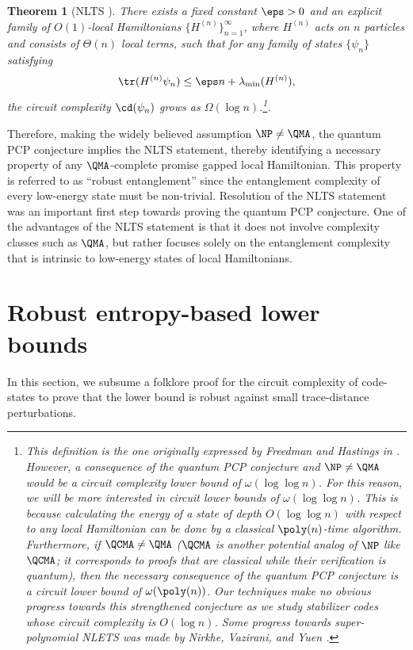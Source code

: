 \documentclass[11pt]{article}
\newtheorem{theorem}{Theorem}[section]
\begin{document}
\begin{theorem}[NLTS \cite{10.5555/2600498.2600507,nlts-proof}]
There exists a fixed constant $\eps > 0$ and an explicit family of $O(1)$-local Hamiltonians $\{H^{(n)}\}_{n=1}^\infty$, where $H^{(n)}$ acts on $n$ particles and consists of $\Theta(n)$ local terms, such that for any family of states $\{\psi_n\}$ satisfying %
\begin{align}\tr(H^{(n)} \psi_n) \leq \eps n + \lambda_{\min}(H^{(n)}),
\end{align}
the circuit complexity $\cd(\psi_n)$ grows as $\Omega(\log n)$.\footnote{This definition is the one originally expressed by Freedman and Hastings in \cite{10.5555/2600498.2600507}. However, a consequence of the quantum PCP conjecture and $\NP \neq \QMA$ would be a circuit complexity lower bound of $\omega(\log \log n)$. For this reason, we will be more interested in circuit lower bounds of $\omega(\log \log n)$. This is because calculating the energy of a state of depth $O(\log \log n)$ with respect to any local Hamiltonian can be done by a classical $\poly(n)$-time algorithm. Furthermore, if $\QCMA \neq \QMA$ ($\QCMA$ is another potential analog of $\NP$ like $\QCMA$; it corresponds to proofs that are classical while their verification is quantum), then the necessary consequence of the quantum PCP conjecture is a circuit lower bound of $\omega(\poly(n))$. Our techniques make no obvious progress towards this strengthened conjecture as we study stabilizer codes whose circuit complexity is $O(\log n)$. Some progress towards super-polynomial NLETS was made by Nirkhe, Vazirani, and Yuen \cite{nirkhe_et_al:LIPIcs:2018:9095}.}.
\end{theorem}

Therefore, making the widely believed assumption $\NP \neq \QMA$, the quantum PCP conjecture implies the NLTS statement, thereby identifying a necessary property of any $\QMA$-complete promise gapped local Hamiltonian. This property is referred to as ``robust entanglement'' since the entanglement complexity of every low-energy state must be non-trivial. Resolution of the NLTS statement was an important first step towards proving the quantum PCP conjecture. One of the advantages of the NLTS statement is that it does not involve complexity classes such as $\QMA$, but rather focuses solely on the entanglement complexity that is intrinsic to low-energy states of local Hamiltonians.



\section{Robust entropy-based lower bounds}
\label{sec:warmup-entropy}
In this section, we subsume a folklore proof for the circuit complexity of code-states to prove that the lower bound is robust %
against  %
small trace-distance perturbations. %
%
\end{document}

